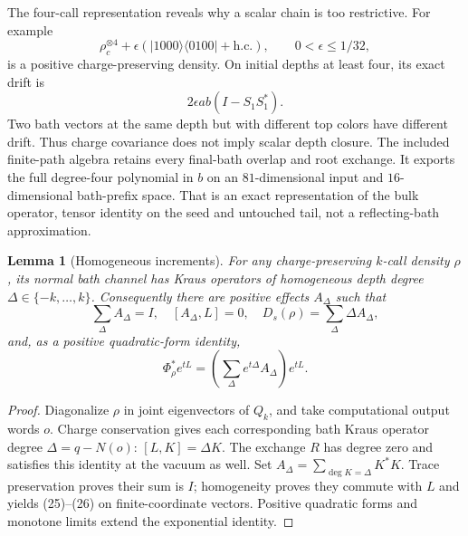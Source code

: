 \documentclass[11pt]{article}
\newtheorem{lemma}[theorem]{Lemma}
\begin{document}
The four-call representation reveals why a scalar chain is too restrictive.
For example
\[
 \rho_c^{\otimes4}
 +\epsilon(|1000\rangle\langle0100|+\mathrm{h.c.}),
 \qquad0<\epsilon\le1/32,
 \tag{23}
\]
is a positive charge-preserving density. On initial depths at least four,
its exact drift is
\[
 2\epsilon ab(I-S_1S_1^*).
 \tag{24}
\]
Two bath vectors at the same depth but with different top colors have
different drift. Thus charge covariance does not imply scalar depth closure.
The included finite-path algebra retains every final-bath overlap and root
exchange. It exports the full degree-four polynomial in $b$ on an
$81$-dimensional input and $16$-dimensional bath-prefix space.
That is an exact representation of the bulk operator, tensor identity on
the seed and untouched tail, not a reflecting-bath approximation.

\begin{lemma}[Homogeneous increments]\label{lem:grade}
For any charge-preserving $k$-call density $\rho$, its normal bath channel
has Kraus operators of homogeneous depth degree
$\Delta\in\{-k,\ldots,k\}$. Consequently there are positive effects
$A_\Delta$ such that
\[
 \sum_\Delta A_\Delta=I,\quad [A_\Delta,L]=0,\quad
 D_s(\rho)=\sum_\Delta\Delta A_\Delta,
 \tag{25}
\]
and, as a positive quadratic-form identity,
\[
 \Phi_\rho^*e^{tL}
 =\left(\sum_\Delta e^{t\Delta}A_\Delta\right)e^{tL}.
 \tag{26}
\]
\end{lemma}
\begin{proof}
Diagonalize $\rho$ in joint eigenvectors of $Q_k$, and take computational
output words $o$. Charge conservation gives each corresponding bath Kraus
operator degree $\Delta=q-N(o)$:
$[L,K]=\Delta K$. The exchange $R$ has degree zero and satisfies this
identity at the vacuum as well. Set $A_\Delta=\sum_{\deg K=\Delta}K^*K$.
Trace preservation proves their sum is $I$; homogeneity proves they commute
with $L$ and yields (25)--(26) on finite-coordinate vectors. Positive
quadratic forms and monotone limits extend the exponential identity.
\end{proof}
\end{document}
